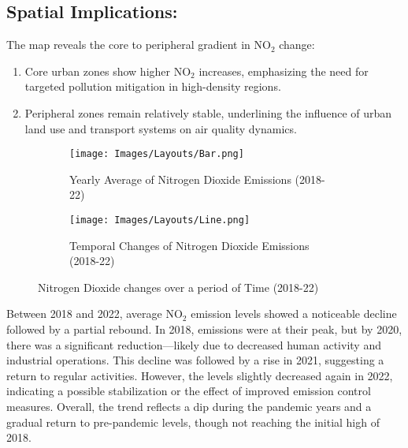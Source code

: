 \documentclass[12pt]{report}
\begin{document}
\subsection{Spatial Implications:}
The map reveals the core to peripheral gradient in NO$_2$ change:
\begin{enumerate}
    \item Core urban zones show higher NO$_2$ increases, emphasizing the need for targeted pollution mitigation in high-density regions.
    \item Peripheral zones remain relatively stable, underlining the influence of urban land use and transport systems on air quality dynamics.
\end{enumerate}
\begin{figure}[H]
    \centering
    \begin{subfigure}[b]{0.45\textwidth}
      \texttt{[image: Images/Layouts/Bar.png]}
      \caption{Yearly Average of Nitrogen Dioxide Emissions (2018-22)}
      \label{fig:bar graph}
    \end{subfigure}
    \hfill
    \begin{subfigure}[b]{0.45\textwidth}
      \texttt{[image: Images/Layouts/Line.png]}
      \caption{Temporal Changes of Nitrogen Dioxide Emissions (2018-22)}
      \label{fig:line graph}
    \end{subfigure}
    \caption{Nitrogen Dioxide changes over a period of Time (2018-22)}
    \label{fig:sidebyside}
  \end{figure}
  Between 2018 and 2022, average NO$_2$ emission levels showed a noticeable decline followed by a partial rebound. In 2018, emissions were at their peak, but by 2020, there was a significant reduction—likely due to decreased human activity and industrial operations. This decline was followed by a rise in 2021, suggesting a return to regular activities. However, the levels slightly decreased again in 2022, indicating a possible stabilization or the effect of improved emission control measures. Overall, the trend reflects a dip during the pandemic years and a gradual return to pre-pandemic levels, though not reaching the initial high of 2018.
\end{document}
